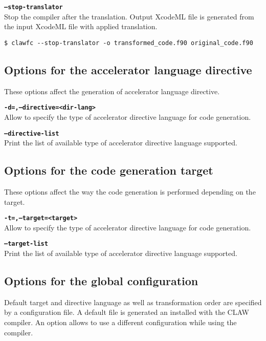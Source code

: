 \documentclass{article}
\begin{document}
\textbf{\texttt{--stop-translator}}\\
Stop the compiler after the translation. Output XcodeML file is generated from the input XcodeML file with applied translation. 
\begin{lstlisting}
$ clawfc --stop-translator -o transformed_code.f90 original_code.f90
\end{lstlisting}

\subsection{Options for the accelerator language directive}
These options affect the generation of accelerator language directive.

\textbf{\texttt{-d=,--directive=<dir-lang>}}\\
Allow to specify the type of accelerator directive language for code generation.

\textbf{\texttt{--directive-list}}\\
Print the list of available type of accelerator directive language supported.

\subsection{Options for the code generation target}
These options affect the way the code generation is performed depending on the target.

\textbf{\texttt{-t=,--target=<target>}}\\
Allow to specify the type of accelerator directive language for code generation.
   
\textbf{\texttt{--target-list}}\\
Print the list of available type of accelerator directive language supported.

\subsection{Options for the global configuration}
Default target and directive language as well as transformation order are specified
by a configuration file. 
A default file is generated an installed with the CLAW compiler. An option allows to 
use a different configuration while using the compiler. 
\end{document}
